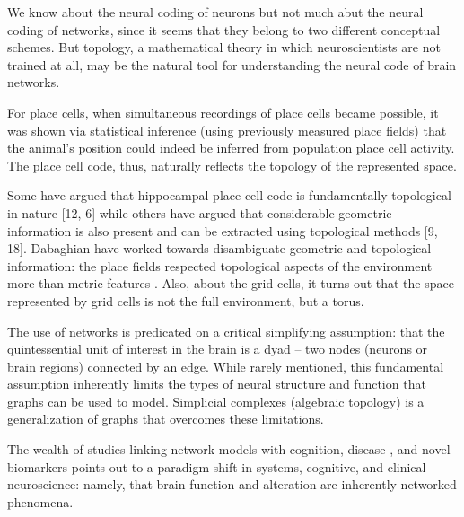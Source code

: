 \documentclass[onecollarge,runningheads]{svjour2}
\begin{document}
We know about the neural coding of neurons but not much abut the neural coding of networks, since it seems that they belong to two different conceptual schemes. But topology, a mathematical theory in which neuroscientists are not trained at all, may be the natural tool for understanding the neural code of brain networks.

For place cells, when simultaneous recordings of place cells became possible, it was shown via statistical inference (using previously measured place fields) that the animal's position could indeed be inferred from population place cell activity. The place cell code, thus, naturally reflects the topology of the represented space.

\citep{curto2016can} Some have argued that hippocampal place cell code is fundamentally topological in nature [12, 6] while others have argued that considerable geometric information is also present and can be extracted using topological methods [9, 18]. Dabaghian have worked towards disambiguate geometric and topological information: the place fields respected topological aspects of the environment more than metric features \citep{dabaghian2014reconceiving}. Also, about the grid cells, it turns out that the space represented by grid cells is not the full environment, but a torus.

\citep{giusti2016two} The use of networks is predicated on a critical simplifying assumption: that the quintessential unit of interest in the brain is a dyad – two nodes (neurons or brain regions) connected by an edge. While rarely mentioned, this fundamental assumption inherently
limits the types of neural structure and function that graphs can be used to model. Simplicial complexes (algebraic topology) is a generalization of graphs that overcomes these limitations.

The wealth of studies linking network models with cognition, disease \citep{stefan2013epileptic}, \citep{stam2014modern} and novel biomarkers points out to a paradigm shift in systems, cognitive, and clinical neuroscience: namely, that brain function and alteration are inherently networked phenomena.

\end{document}
